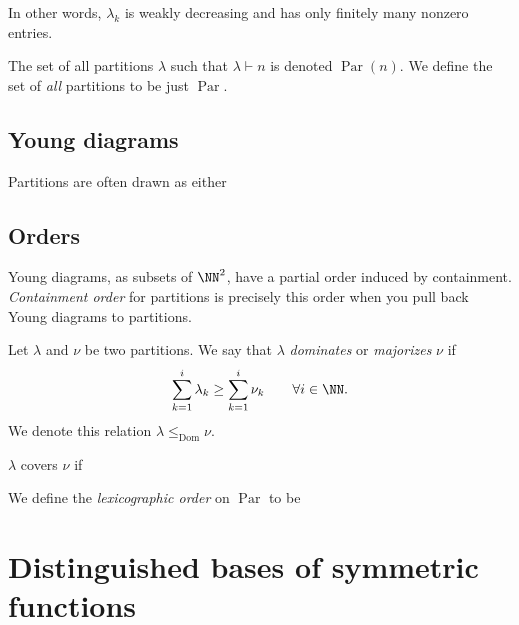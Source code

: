 \documentclass{article}
\DeclareMathOperator{\Par}{Par}
\DeclareMathOperator{\Dom}{Dom}
\begin{document}
In other words, $\lambda_k$ is weakly decreasing and has only finitely many nonzero entries. 

The set of all partitions $\lambda$ such that $\lambda \vdash n$ is denoted $\Par(n)$. We define the set of \textit{all} partitions to be just $\Par$.

\subsection{Young diagrams}
Partitions are often drawn as either 

\subsection{Orders}

\begin{definition}
    Young diagrams, as subsets of $\NN^2$, have a partial order induced by containment. \textit{Containment order} for partitions is precisely this order when you pull back Young diagrams to partitions.
\end{definition}

\begin{definition}
    Let $\lambda$ and $\nu$ be two partitions. We say that $\lambda$ \textit{dominates} or \textit{majorizes} $\nu$ if
    \[
        \sum_{k=1}^i \lambda_k \geq \sum_{k=1}^i \nu_k \qquad \forall i\in\NN.
    \]
    We denote this relation $\lambda \leq_{\Dom} \nu$.
\end{definition}

\begin{theorem}
    $\lambda$ covers $\nu$ if
\end{theorem}

\begin{definition}
    We define the \textit{lexicographic order} on $\Par$ to be
\end{definition}

\begin{theorem}
\end{theorem}

\begin{theorem}
\end{theorem}

\section{Distinguished bases of symmetric functions}
\end{document}
